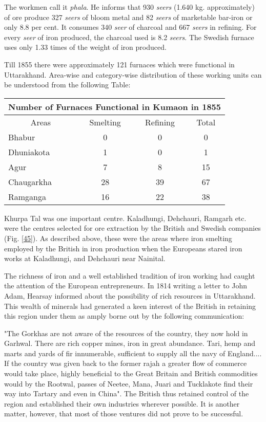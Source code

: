 The workmen call it {\it phala}. He informs that 930 {\it seers} (1.640 kg. approximately) of ore produce 327 {\it seers} of bloom metal and 82 {\it seers} of marketable bar-iron or only 8.8 per cent. It consumes 340 {\it seer} of charcoal and 667 {\it seers} in refining. For every {\it seer} of iron produced, the charcoal used is 8.2 {\it seers}. The Swedish furnace uses only 1.33 times of the weight of iron produced. 

Till 1855 there were approximately 121 furnaces which were functional in Uttarakhand. Area-wise and category-wise distribution of these working units can be understood from the following Table:
\newpage

\begin{longtable}{|l|c|c|c|}
\multicolumn{4}{c}{\textbf{Number of Furnaces Functional in Kumaon in 1855}}\\[10pt]
\hline 
\multicolumn{1}{|c|}{Areas} & Smelting & Refining & Total\\
\hline
Bhabur & 0 & 0 & 0\\
\hline
Dhuniakota & 1 & 0 &1\\
\hline
Agur & 7 & 8 &15\\
\hline
Chaugarkha & 28 & 39 & 67\\
\hline
Ramganga & 16 & 22 & 38\\
\hline
\end{longtable}

Khurpa Tal was one important centre. Kaladhungi, Dehchauri, Ramgarh etc. were the centres selected for ore extraction by the British and Swedish companies (Fig. \ref{45}). As described above, these were the areas where iron smelting employed by the British in iron production when the Europeans stared iron works at Kaladhungi, and Dehchauri near Nainital.

The richness of iron and a well established tradition of iron working had caught the attention of the European entrepreneurs. In 1814 writing a letter to John Adam, Hearsay informed about the possibility of rich resources in Uttarakhand. This wealth of minerals had generated a keen interest of the British in retaining this region under them as amply borne out by the following communication:

"The Gorkhas are not aware of the resources of the country, they now hold in Garhwal. There are rich copper mines, iron in great abundance. Tari, hemp and marts and yards of fir innumerable, sufficient to supply all the navy of England.... If the country was given back to the former rajah a greater flow of commerce would take place, highly beneficial to the Great Britain and British commodities would by the Rootwal, passes of Neetee, Mana, Juari and Tucklakote find their way into Tartary and even in China". The British thus retained control of the region and established their own industries wherever possible. It is another matter, however, that most of those ventures did not prove to be successful.

